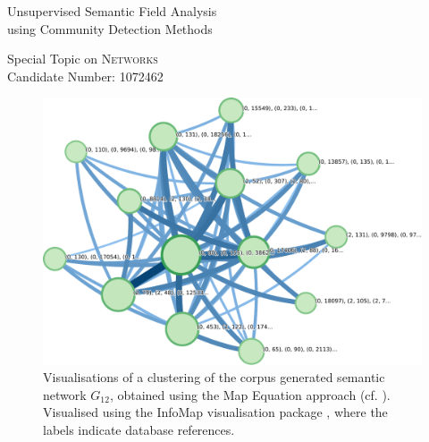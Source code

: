 \documentclass[12pt, a4paper]{article}
\title{\topictitle}
\author{Candidate \candidatenumber}
\date{\today}
\newcommand{\topictitle}{Unsupervised Semantic Field Analysis \\ \large using Community Detection Methods}
\newcommand{\candidatenumber}{1072462}
\newcommand{\course}{Networks}
\begin{document}
  \pagestyle{plain}
  \begin{center}
    \vspace*{-2.5cm}
    \Large \topictitle \\
    \vspace{.3cm}

    \normalsize Special Topic on \textcolor{themecolor3}{\textsc{\course}}\\
    \normalsize Candidate Number: \textcolor{themecolor3}{\candidatenumber}
    \vspace{.3cm}
  \end{center}

  \begin{abstract}
    \label{abstract}
    In this work we will attempt to compare methods in the domain of semantic field tagging by considering a language literature corpus as a large graph of neighbouring words. The network is built by performing part-of-speech tagging iteratively on the entire corpus and linking together principal words that are connected in a neighbouring sense up to a radius of $r$ words.
    The resulting graph $G_r$ is then analysed using community detection methods such as \textit{Louvain Clustering}, \textit{Chinese Whispers}, \textit{Clauset Greedy Modularity} and other clustering approaches which we only discuss briefly.
    We derive the gain in modularity presented in the original work \cite{lambiotte-louvain-clustering} upon atomic modification of the clusters $\{C_i\}_{i=1}^{n_C}$.
    The Chinese Whispers algorithm is a simple graph clustering method originating from research in Natural Language Processing \parencite{cw-biemann} and it is well-established for semantic field analysis.
    The abovementioned algorithms are applied to a real-world corpus of the Latin language, working with a graph of 10843 nodes and 2.4 million edges.
    We compare them in terms of output modularity, runtime and number of clusters on the graphs introduced, which we compare to the eigengap in the spectrum of the graph Laplacian.
  \end{abstract}

  \begin{figure}[H]
    \centering
    \includegraphics[width=0.65\linewidth]{figures/library-graph-12.pajek.ftree.pdf}
    \caption{Visualisations of a clustering of the corpus generated semantic network $G_{12}$, obtained using the Map Equation approach (cf. ). Visualised using the InfoMap visualisation package \parencite{mapequation}, where the labels indicate database references.}
    \label{fig:mapequation}
  \end{figure}
\end{document}
